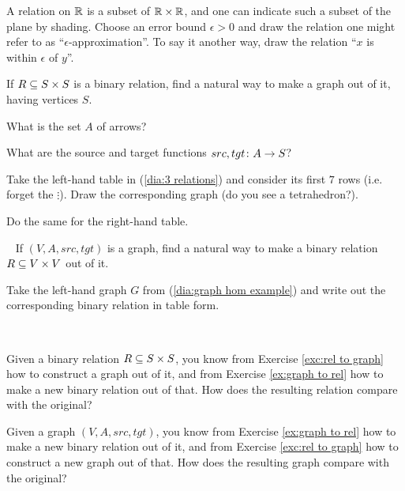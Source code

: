 \documentclass[CT4S-EN-RU]{subfiles}
\begin{document}
\begin{exerciseENG}
A relation on $\RR$ is a subset of $\RR\times\RR$, and one can indicate such a subset of the plane by shading. Choose an error bound $\epsilon>0$ and draw the relation one might refer to as “$\epsilon$-approximation”. To say it another way, draw the relation “$x$ is within $\epsilon$ of $y$”.
\end{exerciseENG}

\begin{exerciseRUS}
\end{exerciseRUS}

\begin{exerciseENG}\label{exc:rel to graph}
\sexc If $R\ss S\times S$ is a binary relation, find a natural way to make a graph out of it, having vertices $S$. 
\item What is the set $A$ of arrows? 
\item What are the source and target functions $src,tgt\taking A\to S$?
\item Take the left-hand table in (\ref{dia:3 relations}) and consider its first $7$ rows (i.e. forget the $\vdots$). Draw the corresponding graph (do you see a tetrahedron?). 
\item Do the same for the right-hand table.
\endsexc
\end{exerciseENG}

\begin{exerciseRUS}\label{exc:rel to graph}
\end{exerciseRUS}

\begin{exerciseENG}\label{ex:graph to rel}~
\sexc If $(V,A,src,tgt)$ is a graph, find a natural way to make a binary relation $R\ss V\times V$ out of it. 
\item Take the left-hand graph $G$ from (\ref{dia:graph hom example}) and write out the corresponding binary relation in table form.
\endsexc
\end{exerciseENG}

\begin{exerciseRUS}\label{ex:graph to rel}~
\end{exerciseRUS}

\begin{exerciseENG}
\sexc Given a binary relation $R\ss S\times S$, you know from Exercise \ref{exc:rel to graph} how to construct a graph out of it, and from Exercise \ref{ex:graph to rel} how to make a new binary relation out of that. How does the resulting relation compare with the original?
\item Given a graph $(V,A,src,tgt)$, you know from Exercise \ref{ex:graph to rel} how to make a new binary relation out of it, and from Exercise \ref{exc:rel to graph} how to construct a new graph out of that. How does the resulting graph compare with the original? 
\endsexc
\end{exerciseENG}

\begin{exerciseRUS}
\end{exerciseRUS}
\end{document}
